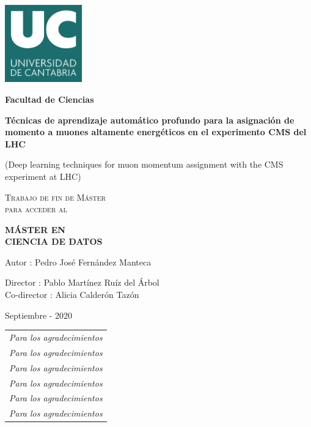 \documentclass[a4paper,12pt]{article}
\begin{document}
\begin{titlepage}
\centering
\includegraphics[width=0.25\textwidth]{figures/logo_UC.jpg} 
\par 
\vspace{1cm}
{\LARGE \textbf{Facultad de Ciencias} \par}
\vspace{1.5cm}
{\LARGE\bfseries T\'ecnicas de aprendizaje autom\'atico profundo para la asignaci\'on de momento a muones altamente energ\'eticos en el experimento CMS del LHC}
\vspace{0.6cm}
\\
{\LARGE (Deep learning techniques for muon momentum assignment with the CMS experiment at LHC) \par}
\vspace{2.6cm}
{\scshape\large Trabajo de fin de M\'aster \\ para acceder al \par}
\vspace{0.3cm}
{\scshape\Large \textbf{M\'ASTER EN \\ CIENCIA DE DATOS} \par}
\begin{flushright}
\vspace{2.6cm}
{\large Autor : Pedro Jos\'e Fern\'andez Manteca \par}
{\large Director : Pablo Mart\'inez Ru\'iz del \'Arbol\\}
{\large Co-director : Alicia Calder\'on Taz\'on\\}
\vspace{0.5cm}
{\large Septiembre - 2020\par}
\vfill
\end{flushright}
\end{titlepage}


\newpage

\null\hfill\begin{tabular}[t]{l@{}}
  \textit{Para los agradecimientos} \\
  \textit{Para los agradecimientos} \\
  \textit{Para los agradecimientos} \\
  \textit{Para los agradecimientos} \\
  \textit{Para los agradecimientos} \\
  \textit{Para los agradecimientos} \\
\end{tabular}
\end{document}
